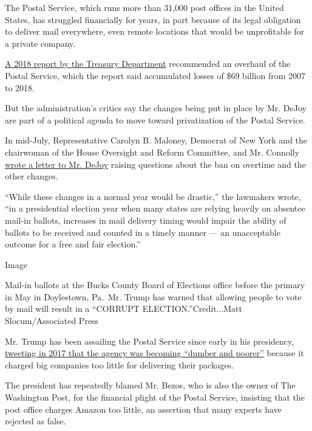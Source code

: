 The Postal Service, which runs more than 31,000 post offices in the
United States, has struggled financially for years, in part because of
its legal obligation to deliver mail everywhere, even remote locations
that would be unprofitable for a private company.

\href{https://home.treasury.gov/system/files/136/USPS_A_Sustainable_Path_Forward_report_12-04-2018.pdf}{A
2018 report by the Treasury Department} recommended an overhaul of the
Postal Service, which the report said accumulated losses of \$69 billion
from 2007 to 2018.

But the administration's critics say the changes being put in place by
Mr. DeJoy are part of a political agenda to move toward privatization of
the Postal Service.

In mid-July, Representative Carolyn B. Maloney, Democrat of New York and
the chairwoman of the House Oversight and Reform Committee, and Mr.
Connolly
\href{https://oversight.house.gov/sites/democrats.oversight.house.gov/files/2020-07-20.CBM\%20GEC\%20to\%20DeJoy\%20-PMG\%20re\%20Postal\%20Service\%20Changes.pdf}{wrote
a letter to Mr. DeJoy} raising questions about the ban on overtime and
the other changes.

``While these changes in a normal year would be drastic,'' the lawmakers
wrote, ``in a presidential election year when many states are relying
heavily on absentee mail-in ballots, increases in mail delivery timing
would impair the ability of ballots to be received and counted in a
timely manner --- an unacceptable outcome for a free and fair
election.''

Image

Mail-in ballots at the Bucks County Board of Elections office before the
primary in May in Doylestown, Pa.~Mr. Trump has warned that allowing
people to vote by mail will result in a ``CORRUPT
ELECTION.''Credit...Matt Slocum/Associated Press

Mr. Trump has been assailing the Postal Service since early in his
presidency,
\href{https://twitter.com/realDonaldTrump/status/946728546633953285?s=20}{tweeting
in 2017 that the agency was becoming ``dumber and poorer''} because it
charged big companies too little for delivering their packages.

The president has repeatedly blamed Mr. Bezos, who is also the owner of
The Washington Post, for the financial plight of the Postal Service,
insisting that the post office charges Amazon too little, an assertion
that many experts have rejected as false.

